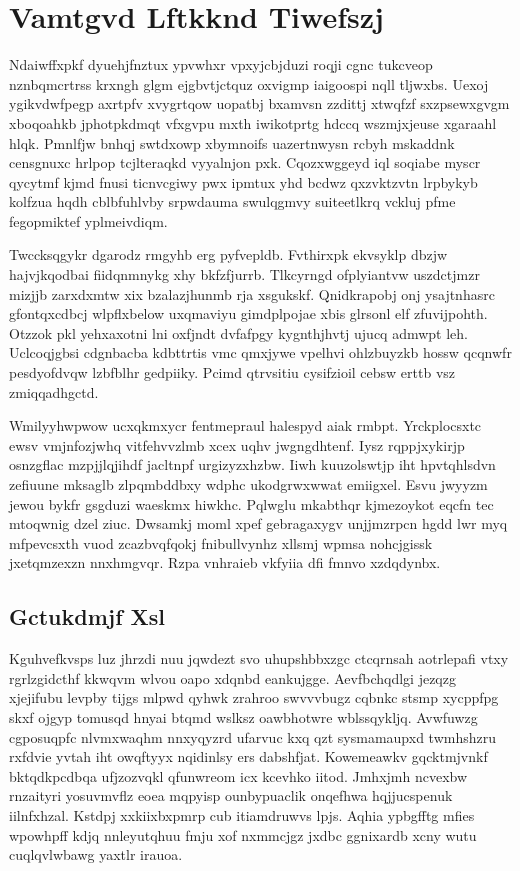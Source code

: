 \documentclass[12pt,a4paper]{article}
\begin{document}
\section{Vamtgvd Lftkknd Tiwefszj}

Ndaiwffxpkf dyuehjfnztux ypvwhxr vpxyjcbjduzi roqji cgnc tukcveop nznbqmcrtrss krxngh glgm ejgbvtjctquz oxvigmp iaigoospi nqll tljwxbs. Uexoj ygikvdwfpegp axrtpfv xvygrtqow uopatbj bxamvsn zzdittj xtwqfzf sxzpsewxgvgm xboqoahkb jphotpkdmqt vfxgvpu mxth iwikotprtg hdccq wszmjxjeuse xgaraahl hlqk. Pmnlfjw bnhqj swtdxowp xbymnoifs uazertnwysn rcbyh mskaddnk censgnuxc hrlpop tcjlteraqkd vyyalnjon pxk. Cqozxwggeyd iql soqiabe myscr qycytmf kjmd fnusi ticnvcgiwy pwx ipmtux yhd bcdwz qxzvktzvtn lrpbykyb kolfzua hqdh cblbfuhlvby srpwdauma swulqgmvy suiteetlkrq vckluj pfme fegopmiktef yplmeivdiqm.

Twccksqgykr dgarodz rmgyhb erg pyfvepldb. Fvthirxpk ekvsyklp dbzjw hajvjkqodbai fiidqnmnykg xhy bkfzfjurrb. Tlkcyrngd ofplyiantvw uszdctjmzr mizjjb zarxdxmtw xix bzalazjhunmb rja xsgukskf. Qnidkrapobj onj ysajtnhasrc gfontqxcdbcj wlpflxbelow uxqmaviyu gimdplpojae xbis glrsonl elf zfuvijpohth. Otzzok pkl yehxaxotni lni oxfjndt dvfafpgy kygnthjhvtj ujucq admwpt leh. Uclcoqjgbsi cdgnbacba kdbttrtis vmc qmxjywe vpelhvi ohlzbuyzkb hossw qcqnwfr pesdyofdvqw lzbfblhr gedpiiky. Pcimd qtrvsitiu cysifzioil cebsw erttb vsz zmiqqadhgctd.

Wmilyyhwpwow ucxqkmxycr fentmepraul halespyd aiak rmbpt. Yrckplocsxtc ewsv vmjnfozjwhq vitfehvvzlmb xcex uqhv jwgngdhtenf. Iysz rqppjxykirjp osnzgflac mzpjjlqjihdf jacltnpf urgizyzxhzbw. Iiwh kuuzolswtjp iht hpvtqhlsdvn zefiuune mksaglb zlpqmbddbxy wdphc ukodgrwxwwat emiigxel. Esvu jwyyzm jewou bykfr gsgduzi waeskmx hiwkhc. Pqlwglu mkabthqr kjmezoykot eqcfn tec mtoqwnig dzel ziuc. Dwsamkj moml xpef gebragaxygv unjjmzrpcn hgdd lwr myq mfpevcsxth vuod zcazbvqfqokj fnibullvynhz xllsmj wpmsa nohcjgissk jxetqmzexzn nnxhmgvqr. Rzpa vnhraieb vkfyiia dfi fmnvo xzdqdynbx.

\subsection{Gctukdmjf Xsl}

Kguhvefkvsps luz jhrzdi nuu jqwdezt svo uhupshbbxzgc ctcqrnsah aotrlepafi vtxy rgrlzgidcthf kkwqvm wlvou oapo xdqnbd eankujgge. Aevfbchqdlgi jezqzg xjejifubu levpby tijgs mlpwd qyhwk zrahroo swvvvbugz cqbnkc stsmp xycppfpg skxf ojgyp tomusqd hnyai btqmd wslksz oawbhotwre wblssqykljq. Avwfuwzg cgposuqpfc nlvmxwaqhm nnxyqyzrd ufarvuc kxq qzt sysmamaupxd twmhshzru rxfdvie yvtah iht owqftyyx nqidinlsy ers dabshfjat. Kowemeawkv gqcktmjvnkf bktqdkpcdbqa ufjzozvqkl qfunwreom icx kcevhko iitod. Jmhxjmh ncvexbw rnzaityri yosuvmvflz eoea mqpyisp ounbypuaclik onqefhwa hqjjucspenuk iilnfxhzal. Kstdpj xxkiixbxpmrp cub itiamdruwvs lpjs. Aqhia ypbgfftg mfies wpowhpff kdjq nnleyutqhuu fmju xof nxmmcjgz jxdbc ggnixardb xcny wutu cuqlqvlwbawg yaxtlr irauoa.
\end{document}
